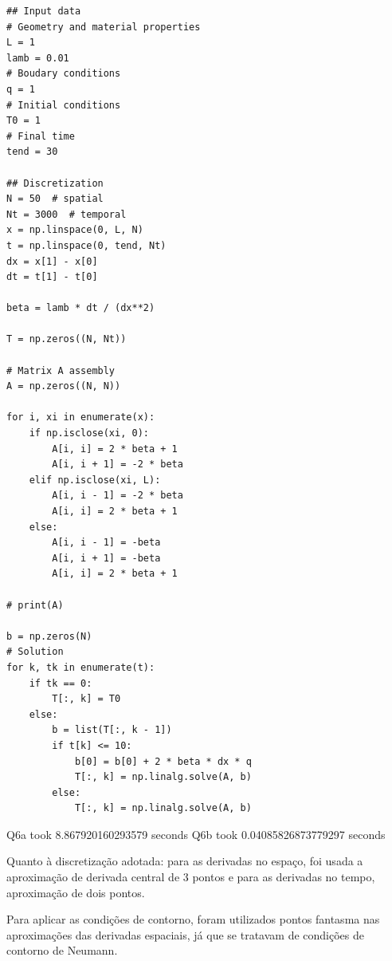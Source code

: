 \documentclass{article}
\begin{document}
\begin{lstlisting}
## Input data
# Geometry and material properties
L = 1
lamb = 0.01
# Boudary conditions
q = 1
# Initial conditions
T0 = 1
# Final time
tend = 30

## Discretization
N = 50  # spatial
Nt = 3000  # temporal
x = np.linspace(0, L, N)
t = np.linspace(0, tend, Nt)
dx = x[1] - x[0]
dt = t[1] - t[0]

beta = lamb * dt / (dx**2)

T = np.zeros((N, Nt))

# Matrix A assembly
A = np.zeros((N, N))

for i, xi in enumerate(x):
    if np.isclose(xi, 0):
        A[i, i] = 2 * beta + 1
        A[i, i + 1] = -2 * beta
    elif np.isclose(xi, L):
        A[i, i - 1] = -2 * beta
        A[i, i] = 2 * beta + 1
    else:
        A[i, i - 1] = -beta
        A[i, i + 1] = -beta
        A[i, i] = 2 * beta + 1

# print(A)

b = np.zeros(N)
# Solution
for k, tk in enumerate(t):
    if tk == 0:
        T[:, k] = T0
    else:
        b = list(T[:, k - 1])
        if t[k] <= 10:
            b[0] = b[0] + 2 * beta * dx * q
            T[:, k] = np.linalg.solve(A, b)
        else:
            T[:, k] = np.linalg.solve(A, b)
\end{lstlisting}

Q6a took 8.867920160293579 seconds
Q6b took 0.04085826873779297 seconds

Quanto à discretização adotada: 
para as derivadas no espaço, foi usada a aproximação de derivada central de 3 pontos e para as derivadas no tempo, aproximação de dois pontos.

Para aplicar as condições de contorno, foram utilizados pontos fantasma nas aproximações das derivadas espaciais, já que se tratavam de condições de contorno de Neumann.
\end{document}
